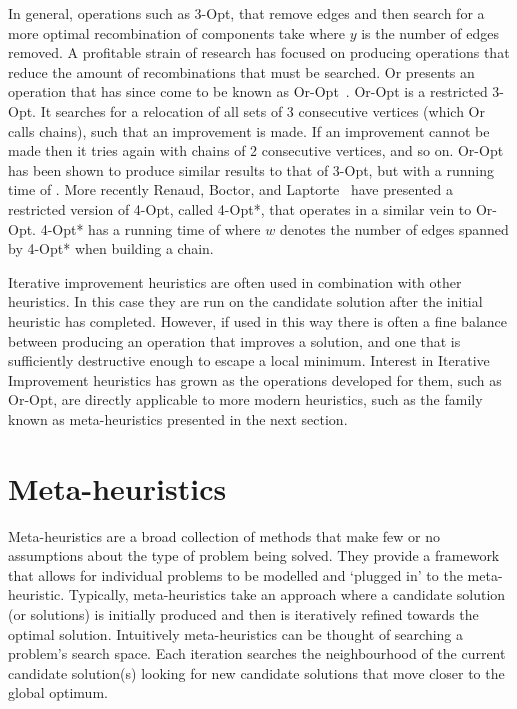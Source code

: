 In general, operations such as 3-Opt, that remove edges and then search for a more optimal recombination of components take  where $y$ is the number of edges removed. A profitable strain of research has focused on producing operations that reduce the amount of recombinations that must be searched. Or presents an operation that has since come to be known as Or-Opt~\cite{Or:1976}. Or-Opt is a restricted 3-Opt. It searches for a relocation of all sets of 3 consecutive vertices (which Or calls chains), such that an improvement is made. If an improvement cannot be made then it tries again with chains of 2 consecutive vertices, and so on. Or-Opt has been shown to produce similar results to that of 3-Opt, but with a running time of . More recently Renaud, Boctor, and Laptorte~\cite{RBL:1996} have presented a restricted version of 4-Opt, called 4-Opt*, that operates in a similar vein to Or-Opt. 4-Opt* has a running time of  where $w$ denotes the number of edges spanned by 4-Opt* when building a chain. 

Iterative improvement heuristics are often used in combination with other heuristics. In this case they are run on the candidate solution after the initial heuristic has completed. However, if used in this way there is often a fine balance between producing an operation that improves a solution, and one that is sufficiently destructive enough to escape a local minimum. Interest in Iterative Improvement heuristics has grown as the operations developed for them, such as Or-Opt, are directly applicable to more modern heuristics, such as the family known as meta-heuristics presented in the next section. 

\section{Meta-heuristics}
\label{sec:mh}

Meta-heuristics are a broad collection of methods that make few or no assumptions about the type of problem being solved. They provide a framework that allows for individual problems to be modelled and `plugged in' to the meta-heuristic. Typically,  meta-heuristics take an approach where a candidate solution (or solutions) is initially produced and then is iteratively refined towards the optimal solution. Intuitively meta-heuristics can be thought of searching a problem's search space. Each iteration searches the neighbourhood of the current candidate solution(s) looking for new candidate solutions that move closer to the global optimum.

